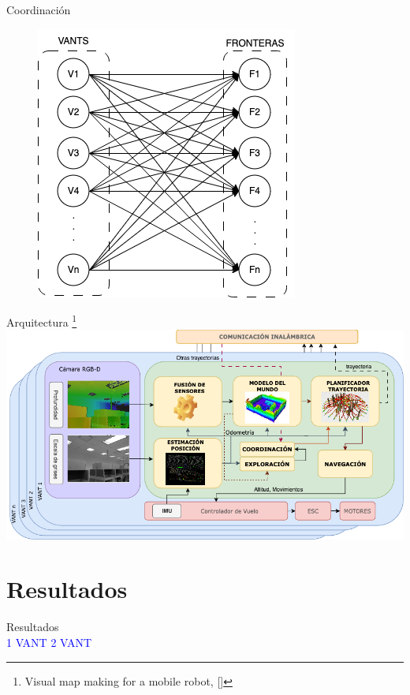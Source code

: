 \documentclass[
  24pt, %
  aspectratio=169, %
]{beamer}
\begin{document}
\begin{frame}{Coordinación}
\begin{figure}[ht!]
\begin{minipage}{0.48\textwidth}
      \centering
      \includegraphics[width=0.5\linewidth]{asignacion} %
    \end{minipage}
  \end{figure}
\end{frame}

\begin{frame}{Arquitectura \footnote{Visual map making for a mobile robot, [\cite{1087348}]}}
\centering
      \includegraphics[width=0.8\linewidth]{arquitectura} %
\end{frame}

\section{Resultados}
\begin{frame}{Resultados}
  \bigskip %
  \centering
  \hfil
  \vspace{2pt}\\
  \textcolor{blue}{1 VANT}
  \hfil
  \textcolor{blue}{2 VANT}
\end{frame}
\end{document}
